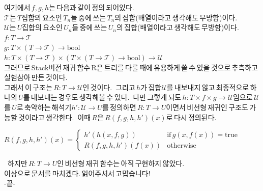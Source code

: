 \documentclass{article}
\begin{document}
여기에서\,$f,g,h$는\,다음과\,같이\,정의\,되어있다.\\
\newline
$\mathcal{T}$는\,$T$집합의\,요소인\,$T_n$들\,중에\,쓰는\,$T_n$의\,집합(배열이라고\,생각해도\,무방함)이다.\\
$\mathcal{U}$는\,$U$집합의\,요소인\,$U_n$들\,중에\,쓰는\,$U_n$의\,집합(배열이라고\,생각해도\,무방함)이다.\\
$f:T \rightarrow \mathcal{T}$\\
$g:T \times (T \rightarrow \mathcal{T}) \rightarrow \text{bool}$\\
$h:T \times (T \rightarrow \mathcal{T}) \times (T \times (T \rightarrow \mathcal{T}) \rightarrow \text{bool}) \rightarrow \mathcal{U}$\\
\newline
그러므로\,Stack버전\,재귀\,함수\,R은\,트리를\,다룰\,때에\,유용하게\,쓸\,수\,있을\,것으로\,추측하고\,실험삼아\,만든\,것이다.\\

그래서\,이\,구조는\,$R:T\rightarrow \mathcal{U}$인\,것이다.\,
그리고\,$h$가\,집합$\mathcal{U}$를\,내보내지\,않고\,최종적으로\,하나의\,$U$를\,내보내는\,경우도\,생각해볼\,수\,있다.\,
다만\,그렇게\,되도\,$h:T\times f \times g \rightarrow \mathcal{U}$임으로\,$\mathcal{U}$를\,$U$로\,축약하는\,해석기$h':\mathcal{U}\rightarrow U$를\,정의하면\,$R:T\rightarrow U$이면서\,비선형\,재귀인\,구조도\,가능할\,것이라고\,생각한다.\,
이때\,$R$은\,$R(f,g,h,h')(x)$로\,다시\,정의된다.
\begin{center}
$R(f,g,h,h')(x)=
\begin{cases}
h'(h(x,f,g)) &
\text{if}\,g(x,f(x))=\text{true} \\
R(f,g,h,h')(f(x)) &
\text{otherwise}
\end{cases}
$
\end{center}
\,
하지만\,$R:T\rightarrow U$인\,비선형\,재귀\,함수는\,아직\,구현하지\,않았다.
\\
\newline
\newline
이상으로\,문서를\,마치겠다.\,읽어주셔서\,고맙습니다!\\
\newline
-끝-
\end{document}
